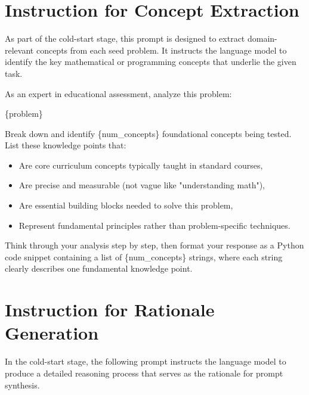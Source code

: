   
  
  \section{Instruction for Concept Extraction}
  \label{app:concept_prompt}
  
  
  As part of the cold-start stage, this prompt is designed to extract domain-relevant concepts from each seed problem. It instructs the language model to identify the key mathematical or programming concepts that underlie the given task.
  
  \begin{tcolorbox}[colback=blue!5!white, colframe=blue!75!black, title=Concept Extraction Prompt]
  As an expert in educational assessment, analyze this problem:
  
  \{problem\}
  
  Break down and identify \{num\_concepts\} foundational concepts being tested. List these knowledge points that:
  \begin{itemize}
      \item Are core curriculum concepts typically taught in standard courses,
      \item Are precise and measurable (not vague like "understanding math"),
      \item Are essential building blocks needed to solve this problem,
      \item Represent fundamental principles rather than problem-specific techniques.
  \end{itemize}
  
  Think through your analysis step by step, then format your response as a Python code snippet containing a list of \{num\_concepts\} strings, where each string clearly describes one fundamental knowledge point.
  \end{tcolorbox}
  
  
  \section{Instruction for Rationale Generation}
  \label{app:rationale_prompt}
  
  In the cold-start stage, the following prompt instructs the language model to produce a detailed reasoning process that serves as the rationale for prompt synthesis. 
  

